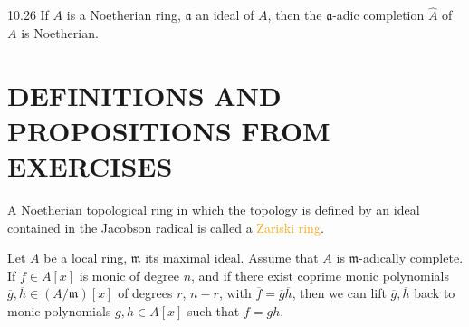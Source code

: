 \begin{theorem}{10.26}
	If $A$ is a Noetherian ring, $\mathfrak{a}$ an ideal of $A$, then the $\mathfrak{a}$-adic completion $\hat{A}$ of $A$ is Noetherian.
\end{theorem}

\section*{DEFINITIONS AND PROPOSITIONS FROM EXERCISES}

\begin{definition}
	A Noetherian topological ring in which the topology is defined by an ideal contained in the Jacobson radical is called a \textcolor{orange}{Zariski ring}.
\end{definition}

\begin{proposition*}
	Let $A$ be a local ring, $\mathfrak{m}$ its maximal ideal. Assume that $A$ is $\mathfrak{m}$-adically complete. If $f\in A[x]$ is monic of degree $n$, and if there exist coprime monic polynomials $\overline{g}, \overline{h}\in(A/\mathfrak{m})[x]$ of degrees $r$, $n-r$, with $\overline{f}=\overline{g}\overline{h}$, then we can lift $\overline{g}, \overline{h}$ back to monic polynomials $g, h\in A[x]$ such that $f=gh$.
\end{proposition*}